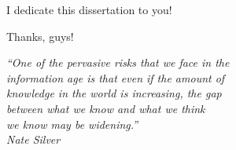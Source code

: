 \newpage

\begin{dedicatoria}
    \vspace*{\fill}
    \hfill
    \begin{minipage}{.6\textwidth}
        I dedicate this dissertation to you!
    \end{minipage}
\end{dedicatoria}
 
\begin{agradecimentos}
	Thanks, guys!
\end{agradecimentos}

\begin{epigrafe}
\vspace*{\fill}

\begin{flushright}
    \hspace{7.5cm}
    \textit{
        ``One of the pervasive risks that we face in the \\ information age is
        that even if the amount of \\ knowledge in the world is increasing,
        the gap \\ between what we know and what we think \\ we know may be
        widening.''} \\
        \textit{Nate Silver}
\end{flushright}
\end{epigrafe}
